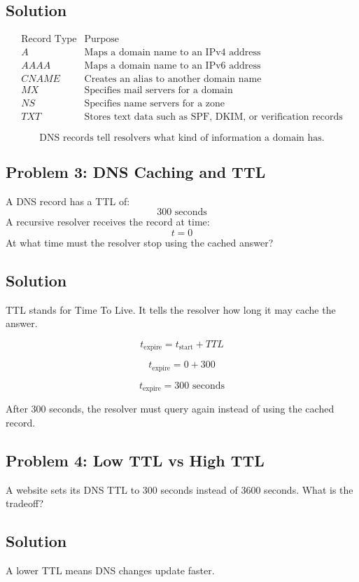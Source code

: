 \documentclass[12pt]{article}
\begin{document}
\subsection*{Solution}

\[
\begin{array}{c|c}
\text{Record Type} & \text{Purpose} \\
\hline
A & \text{Maps a domain name to an IPv4 address} \\
AAAA & \text{Maps a domain name to an IPv6 address} \\
CNAME & \text{Creates an alias to another domain name} \\
MX & \text{Specifies mail servers for a domain} \\
NS & \text{Specifies name servers for a zone} \\
TXT & \text{Stores text data such as SPF, DKIM, or verification records}
\end{array}
\]

\[
\boxed{\text{DNS records tell resolvers what kind of information a domain has.}}
\]

\subsection*{Problem 3: DNS Caching and TTL}
A DNS record has a TTL of:
\[
300 \text{ seconds}
\]
A recursive resolver receives the record at time:
\[
t = 0
\]
At what time must the resolver stop using the cached answer?

\subsection*{Solution}
TTL stands for Time To Live. It tells the resolver how long it may cache the answer.

\[
t_{\text{expire}} = t_{\text{start}} + TTL
\]

\[
t_{\text{expire}} = 0 + 300
\]

\[
\boxed{t_{\text{expire}} = 300 \text{ seconds}}
\]

After 300 seconds, the resolver must query again instead of using the cached record.

\subsection*{Problem 4: Low TTL vs High TTL}
A website sets its DNS TTL to 300 seconds instead of 3600 seconds. What is the tradeoff?

\subsection*{Solution}
A lower TTL means DNS changes update faster.
\end{document}
